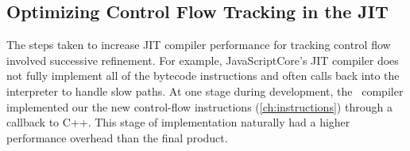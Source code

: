 \begin{enumerate}
\end{enumerate}

\subsection{Optimizing Control Flow Tracking in the JIT}
\label{sec:jitcontrolflow}

The steps taken to increase JIT compiler performance for tracking control flow involved successive refinement.
For example, JavaScriptCore's JIT compiler does not fully implement all of the bytecode instructions and often calls back into the interpreter to handle slow paths.
At one stage during development, the \JitFlow\ compiler implemented our the new control-flow instructions (\autoref{ch:instructions}) through a callback to C++.
This stage of implementation naturally had a higher performance overhead than the final product.

